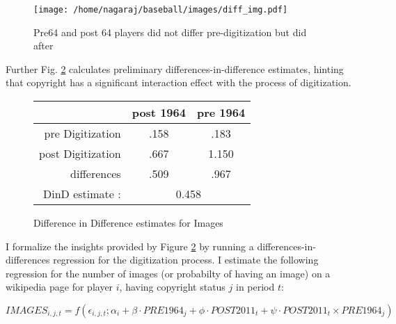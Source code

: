 \documentclass[12pt]{article}
\begin{document}
\begin{figure}[h]
\centering
\texttt{[image: /home/nagaraj/baseball/images/diff\_img.pdf]}
\caption{Pre64 and post 64 players did not differ pre-digitization but did after}
\label{fig:diff_images}
\end{figure}


Further Fig. \ref{fig:diffimgtable} calculates preliminary differences-in-difference estimates, hinting that copyright has a significant interaction effect with the process of digitization.

\begin{figure}[h]
\centering
\begin{tabular}{ | r | c | c | }
  \hline                        
   & post 1964 & pre 1964 \\
  \hline                        
  pre Digitization & .158 & .183 \\
  post Digitization & .667 & 1.150 \\
  \hline
   differences & .509 & .967 \\
  \hline
   DinD estimate : & \multicolumn{2}{|c|}{0.458}  \\
  \hline

\end{tabular}
\caption{Difference in Difference estimates for Images}
\label{fig:diffimgtable}
\end{figure}

I formalize the insights provided by Figure \ref{fig:diffimgtable} by running a differences-in-differences regression for the digitization process. I estimate the following regression for the number of images (or probabilty of having an image) on a wikipedia page for player $i$, having copyright status $j$ in period $t$:

\label{images}
\begin{equation}
IMAGES_{i,j,t} = f(\epsilon_{i,j,t}; \alpha_i + \beta \cdot PRE1964_{j}+ \phi \cdot POST2011_{t} + \psi \cdot POST2011_{t} \times PRE1964_{j})
\end{equation}
\end{document}
